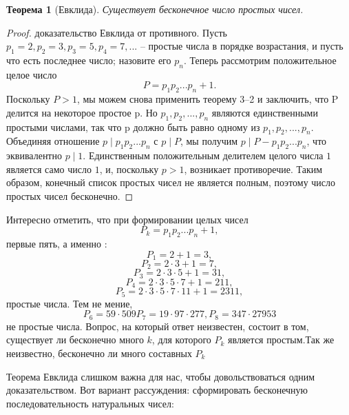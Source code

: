 \documentclass[11pt]{article}
\newtheorem{theorem}{Теорема}
\begin{document}
\begin{theorem}[Евклида]
\label{th3-4}
Существует бесконечное число простых чисел.
\end{theorem}
\begin{proof}
	доказательство Евклида от противного. Пусть ${p_{1} = 2, p_{2} = 3, p _{3} = 5, p_{4} = 7,...}$ -- простые числа в порядке возрастания, и пусть что есть последнее число; назовите его $p_{n}$. Теперь рассмотрим положительное целое число \[P = p_{1}p_{2}...p_{n} + 1.\] Поскольку $P > 1$, мы можем снова применить теорему 3--2 и заключить, что P делится на некоторое простое p. Но $p_{1},p_{2},...,p_{n}$ являются единственными простыми числами, так что p должно быть равно одному из $p_{1},p_{2},...,p_{n}$. Объединяя отношение $p\mid p_{1}p_{2}...p_{n}$ с $p\mid P$, мы получим  $p\mid P - p_{1}p_{2}...p_{n}$, что эквивалентно $p\mid 1$. Единственным положительным делителем целого числа $1$ является само число $1$, и, поскольку $p > 1$, возникает противоречие. Таким образом, конечный список простых чисел не является полным, поэтому число простых чисел бесконечно.
	\end{proof}

\thispagestyle{fancy}
\rhead{\thepage}

Интересно отметить, что при формировании целых чисел \[P_{k} = p_{1}p_{2}...p_{n} + 1,\] первые пять, а именно : \[P_{1} = 2 + 1 = 3,\] 
\[P_{2} = 2\cdot3 + 1 = 7,\] \[P_{3} = 2\cdot3\cdot5 + 1 = 31,\] \[P_{4} = 2\cdot3\cdot5\cdot7 + 1 = 211,\]\[P_{5} = 2\cdot3\cdot5\cdot7\cdot11 + 1 = 2311,\] простые числа. Тем не мение, \[P_{6} = 59\cdot509 P_{7} = 19\cdot97\cdot277, P_{8} = 347\cdot27953\] не простые числа. Вопрос, на который ответ неизвестен, состоит в том, существует ли бесконечно много $k$, для которого $P_{k}$ является простым.Так же неизвестно, бесконечно ли много составных $P_{k}$

Теорема Евклида слишком важна для нас, чтобы довольствоваться одним доказательством. Вот вариант рассуждения: сформировать бесконечную последовательность натуральных чисел:	
\end{document}
